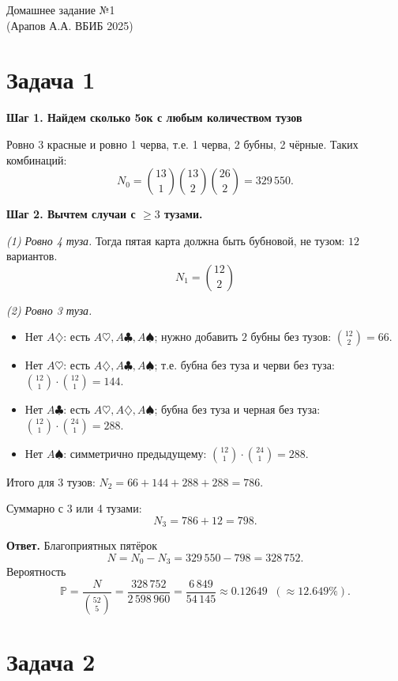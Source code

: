\documentclass[11pt]{article}
\newcommand{\PP}{\mathbb{P}}
\begin{document}
    \begin{center}
    {\LARGE Домашнее задание №1}
        \\[4pt]
        {\small (Арапов А.А. ВБИБ 2025)}
    \end{center}


    \section*{Задача 1}\label{sec:-1}

    \textbf{Шаг 1. Найдем сколько 5ок с любым количеством тузов}

    Ровно 3 красные и ровно 1 черва, т.е. 1 черва, 2 бубны, 2 чёрные.
    Таких комбинаций:
    \[N_0=\binom{13}{1}\binom{13}{2}\binom{26}{2}=329\,550.\]

    \textbf{Шаг 2. Вычтем случаи с $\ge 3$ тузами.}

    \emph{(1) Ровно 4 туза.} Тогда пятая карта должна быть бубновой, не тузом: $12$ вариантов.
    \[
        N_1 = \binom{12}{2}
    \]

    \emph{(2) Ровно 3 туза.}
    \begin{itemize}
        \item Нет $A\diamondsuit$: есть $A\heartsuit,A\clubsuit,A\spadesuit$; нужно добавить $2$ бубны без тузов: $\binom{12}{2}=66$.
        \item Нет $A\heartsuit$: есть $A\diamondsuit,A\clubsuit,A\spadesuit$; т.е. бубна без туза и черви без туза: $\binom{12}{1}\cdot\binom{12}{1}=144$.
        \item Нет $A\clubsuit$: есть $A\heartsuit,A\diamondsuit,A\spadesuit$; бубна без туза и черная без туза: $\binom{12}{1}\cdot\binom{24}{1}=288$.
        \item Нет $A\spadesuit$: симметрично предыдущему: $\binom{12}{1}\cdot\binom{24}{1}=288$.
    \end{itemize}
    Итого для 3 тузов: $ N_2 = 66+144+288+288=786$.

    \smallskip
    Суммарно с 3 или 4 тузами:
    \[
        N_3=786+12=798.
    \]

    \textbf{Ответ.} Благоприятных пятёрок
    \[
        N = N_0-N_3=329\,550-798=328\,752.
    \]
    Вероятность
    \[
        \PP=\frac{N}{\binom{52}{5}}=\frac{328\,752}{2\,598\,960}
        =\frac{6\,849}{54\,145}\approx 0.12649\;\;(\approx 12.649\%).
    \]


    \section*{Задача 2}\label{sec:0}
\end{document}
